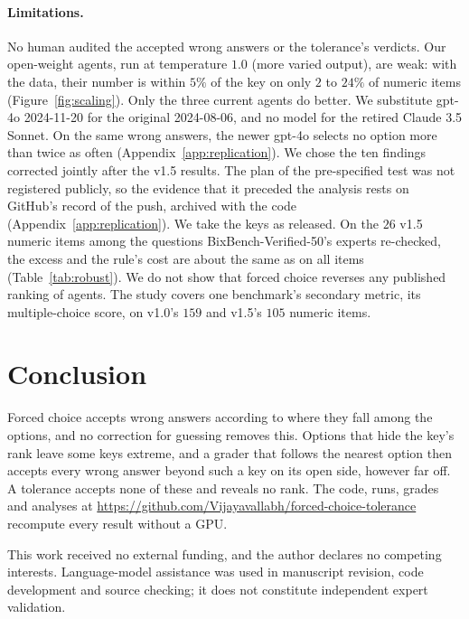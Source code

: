 \documentclass{article}
\begin{document}
\paragraph{Limitations.} No human audited the accepted wrong answers or the tolerance's verdicts. Our open-weight
agents, run at temperature $1.0$ (more varied output), are weak: with the data, their
number is within $5\%$ of the key on only $2$ to $24\%$ of numeric items (Figure~\ref{fig:scaling}). Only the three
current agents do better. We substitute gpt-4o 2024-11-20 for the original 2024-08-06, and no model for the retired Claude
3.5 Sonnet. On the same wrong answers, the newer gpt-4o selects
no option more than twice as often (Appendix~\ref{app:replication}). We chose the ten findings corrected jointly after
the v1.5 results. The plan of the pre-specified test was not registered publicly, so the evidence that it preceded the
analysis rests on GitHub's record of the push, archived with the code (Appendix~\ref{app:replication}). We take the
keys as released. On the $26$ v1.5 numeric items among the questions BixBench-Verified-50's experts re-checked, the
excess and the rule's cost are about the same as on all items (Table~\ref{tab:robust}). We do not show that forced
choice reverses any published ranking of agents. The study covers one benchmark's secondary metric, its
multiple-choice score, on v1.0's $159$ and v1.5's $105$ numeric items.

\section{Conclusion}
\label{sec:conclusion}

Forced choice accepts wrong answers according to where they fall among the options, and no correction for guessing
removes this. Options that hide the key's rank leave some keys extreme, and a grader that follows the nearest option
then accepts every wrong answer beyond such a key on its open side, however far off. A tolerance accepts none of these
and reveals no rank. The code, runs, grades and analyses at
\url{https://github.com/Vijayavallabh/forced-choice-tolerance} recompute every result without a GPU.

\begin{ack}
This work received no external funding, and the author declares no competing interests. Language-model assistance
was used in manuscript revision, code development and source checking; it does not constitute independent expert
validation.
\end{ack}
\end{document}
